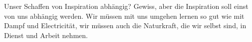 Unser Schaffen von Inspiration abhängig? Gewiss, aber die Inspiration soll einst von uns abhängig werden. Wir müssen mit uns umgehen lernen so gut wie mit Dampf und Electricität, wir müssen auch die Naturkraft, die wir selbst sind, in Dienst und Arbeit nehmen.
\par

